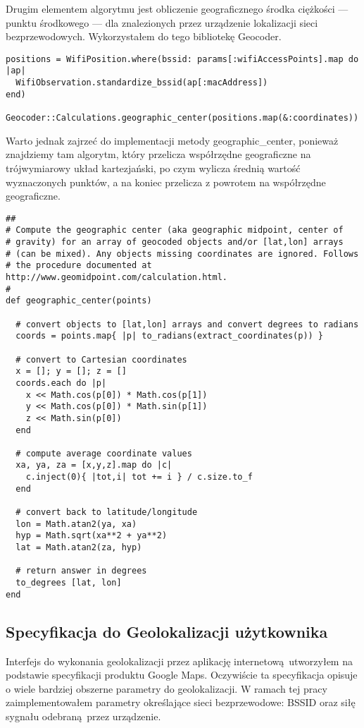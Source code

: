 Drugim elementem algorytmu jest obliczenie geograficznego środka ciężkości — punktu środkowego — dla znalezionych przez urządzenie lokalizacji sieci bezprzewodowych. Wykorzystałem do tego bibliotekę Geocoder.

\begin{verbatim}
positions = WifiPosition.where(bssid: params[:wifiAccessPoints].map do |ap|
  WifiObservation.standardize_bssid(ap[:macAddress])
end)

Geocoder::Calculations.geographic_center(positions.map(&:coordinates))
\end{verbatim}

Warto jednak zajrzeć do implementacji metody geographic_center, ponieważ znajdziemy tam algorytm, który przelicza współrzędne geograficzne na trójwymiarowy układ kartezjański, po czym wylicza średnią wartość wyznaczonych punktów, a na koniec przelicza z powrotem na współrzędne geograficzne.

\begin{verbatim}
##
# Compute the geographic center (aka geographic midpoint, center of
# gravity) for an array of geocoded objects and/or [lat,lon] arrays
# (can be mixed). Any objects missing coordinates are ignored. Follows
# the procedure documented at http://www.geomidpoint.com/calculation.html.
#
def geographic_center(points)

  # convert objects to [lat,lon] arrays and convert degrees to radians
  coords = points.map{ |p| to_radians(extract_coordinates(p)) }

  # convert to Cartesian coordinates
  x = []; y = []; z = []
  coords.each do |p|
    x << Math.cos(p[0]) * Math.cos(p[1])
    y << Math.cos(p[0]) * Math.sin(p[1])
    z << Math.sin(p[0])
  end

  # compute average coordinate values
  xa, ya, za = [x,y,z].map do |c|
    c.inject(0){ |tot,i| tot += i } / c.size.to_f
  end

  # convert back to latitude/longitude
  lon = Math.atan2(ya, xa)
  hyp = Math.sqrt(xa**2 + ya**2)
  lat = Math.atan2(za, hyp)

  # return answer in degrees
  to_degrees [lat, lon]
end
\end{verbatim}

\subsection{Specyfikacja do Geolokalizacji użytkownika}
Interfejs do wykonania geolokalizacji przez aplikację internetową utworzyłem na podstawie specyfikacji produktu Google Maps.\cite{GoogleMapsGeolocationAPI} Oczywiście ta specyfikacja opisuje o wiele bardziej obszerne parametry do geolokalizacji. W ramach tej pracy zaimplementowałem parametry określające sieci bezprzewodowe: BSSID oraz siłę sygnału odebraną przez urządzenie.

